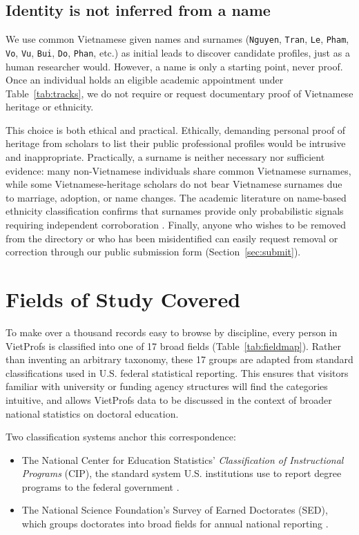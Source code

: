 \documentclass[11pt]{article}
\newcommand{\code}[1]{\texttt{\small #1}}
\begin{document}
\subsection{Identity is not inferred from a name}
We use common Vietnamese given names and surnames (\code{Nguyen}, \code{Tran}, \code{Le}, \code{Pham}, \code{Vo}, \code{Vu}, \code{Bui}, \code{Do}, \code{Phan}, etc.) as initial leads to discover candidate profiles, just as a human researcher would.
However, a name is only a starting point, never proof. Once an individual holds an eligible academic appointment under Table~\ref{tab:tracks}, we do not require or request documentary proof of Vietnamese heritage or ethnicity.

This choice is both ethical and practical. Ethically, demanding personal proof of heritage from scholars to list their public professional profiles would be intrusive and inappropriate. Practically, a surname is neither necessary nor sufficient evidence: many non-Vietnamese individuals share common Vietnamese surnames, while some Vietnamese-heritage scholars do not bear Vietnamese surnames due to marriage, adoption, or name changes. The academic literature on name-based ethnicity classification confirms that surnames provide only probabilistic signals requiring independent corroboration \cite{mateos2007name,ambekar2009name}.
Finally, anyone who wishes to be removed from the directory or who has been misidentified can easily request removal or correction through our public submission form (Section~\ref{sec:submit}).

\section{Fields of Study Covered}
\label{sec:fields}
To make over a thousand records easy to browse by discipline, every person in VietProfs is classified into one of 17 broad fields (Table~\ref{tab:fieldmap}).
Rather than inventing an arbitrary taxonomy, these 17 groups are adapted from standard classifications used in U.S. federal statistical reporting. This ensures that visitors familiar with university or funding agency structures will find the categories intuitive, and allows VietProfs data to be discussed in the context of broader national statistics on doctoral education.

Two classification systems anchor this correspondence:
\begin{itemize}
\item The National Center for Education Statistics' \emph{Classification of Instructional Programs} (CIP), the standard system U.S. institutions use to report degree programs to the federal government \cite{nces_cip2020}.
\item The National Science Foundation's Survey of Earned Doctorates (SED), which groups doctorates into broad fields for annual national reporting \cite{nsf_sed}.
\end{itemize}
\end{document}
